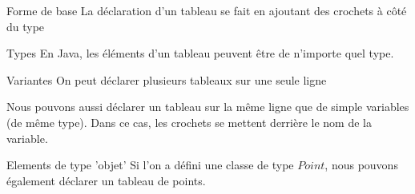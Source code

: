 \begin{frame}{Forme de base}
    La déclaration d'un tableau se fait en ajoutant des crochets à côté du type
    

    \begin{exampleblock}{Types}
        En Java, les éléments d'un tableau peuvent être de n'importe quel type.
    \end{exampleblock}

    

\end{frame}

\begin{frame}{Variantes}
    On peut déclarer plusieurs tableaux sur une seule ligne
    
    Nous pouvons aussi déclarer un tableau sur la même ligne que de simple variables (de même type).
    Dans ce cas, les crochets se mettent derrière le nom de la variable.
    
\end{frame}

\begin{frame}{Elements de type 'objet'}
    Si l'on a défini une classe de type $Point$, nous pouvons également déclarer un tableau de points.

    
\end{frame}
